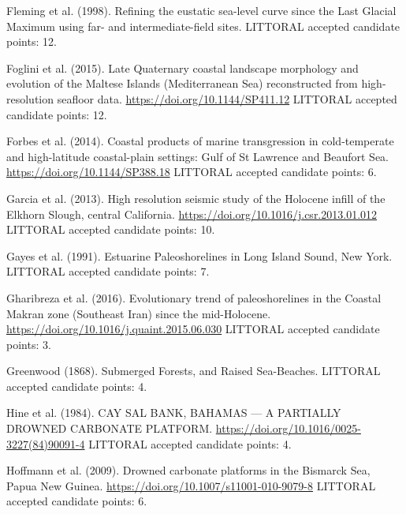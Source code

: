 \documentclass[twocolumn,10pt]{article}
\begin{document}
\begin{thebibliography}{}
Fleming et al. (1998).
\newblock Refining the eustatic sea-level curve since the Last Glacial Maximum using far- and intermediate-field sites.
\newblock LITTORAL accepted candidate points: 12.

Foglini et al. (2015).
\newblock Late Quaternary coastal landscape morphology and evolution of the Maltese Islands (Mediterranean Sea) reconstructed from high-resolution seafloor data.
\newblock \url{https://doi.org/10.1144/SP411.12}
\newblock LITTORAL accepted candidate points: 12.

Forbes et al. (2014).
\newblock Coastal products of marine transgression in cold-temperate and high-latitude coastal-plain settings: Gulf of St Lawrence and Beaufort Sea.
\newblock \url{https://doi.org/10.1144/SP388.18}
\newblock LITTORAL accepted candidate points: 6.

Garcia et al. (2013).
\newblock High resolution seismic study of the Holocene infill of the Elkhorn Slough, central California.
\newblock \url{https://doi.org/10.1016/j.csr.2013.01.012}
\newblock LITTORAL accepted candidate points: 10.

Gayes et al. (1991).
\newblock Estuarine Paleoshorelines in Long Island Sound, New York.
\newblock LITTORAL accepted candidate points: 7.

Gharibreza et al. (2016).
\newblock Evolutionary trend of paleoshorelines in the Coastal Makran zone (Southeast Iran) since the mid-Holocene.
\newblock \url{https://doi.org/10.1016/j.quaint.2015.06.030}
\newblock LITTORAL accepted candidate points: 3.

Greenwood (1868).
\newblock Submerged Forests, and Raised Sea-Beaches.
\newblock LITTORAL accepted candidate points: 4.

Hine et al. (1984).
\newblock CAY SAL BANK, BAHAMAS — A PARTIALLY DROWNED CARBONATE PLATFORM.
\newblock \url{https://doi.org/10.1016/0025-3227(84)90091-4}
\newblock LITTORAL accepted candidate points: 4.

Hoffmann et al. (2009).
\newblock Drowned carbonate platforms in the Bismarck Sea, Papua New Guinea.
\newblock \url{https://doi.org/10.1007/s11001-010-9079-8}
\newblock LITTORAL accepted candidate points: 6.


\end{thebibliography}
\end{document}
